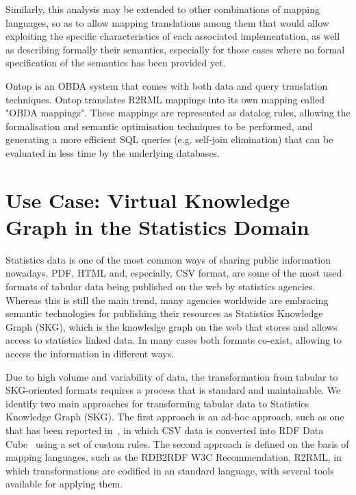 Similarly, this analysis may be extended to other combinations of mapping languages, so as to allow mapping translations among them that would allow exploiting the specific characteristics of each associated implementation, as well as describing formally their semantics, especially for those cases where no formal specification of the semantics has been provided yet.

Ontop \citep{rodriguez2015efficient} is an OBDA system that comes with both data and query translation techniques. Ontop translates R2RML mappings into its own mapping called "OBDA mappings". These mappings are represented as datalog rules, allowing the formalisation and semantic optimisation techniques to be performed, and generating a more efficient SQL queries (e.g. self-join elimination) that can be evaluated in less time by the underlying databases.


\section{Use Case: Virtual Knowledge Graph in the Statistics Domain}
\label{sec:chap4_rmlc}

Statistics data is one of the most common ways of sharing public information nowadays. PDF, HTML and, especially, CSV format, are some of the most used formats of tabular data being published on the web by statistics agencies. Whereas this is still the main trend, many agencies worldwide are embracing semantic technologies for publishing their resources as Statistics Knowledge Graph (SKG), which is the knowledge graph on the web that stores and allows access to statistics linked data. In many cases both formats co-exist, allowing to access the information in different ways. 

Due to high volume and variability of data, the transformation from tabular to SKG-oriented formats requires a process that is standard and maintainable. We identify two main approaches for transforming tabular data to Statistics Knowledge Graph (SKG). The first approach is an ad-hoc approach, such as one that has been reported in~\citep{corcho2017publishing}, in which CSV data is converted into RDF Data Cube~\citep{cyganiak2012rdf} using a set of custom rules. The second approach is defined on the basis of mapping languages, such as the RDB2RDF W3C Recommendation, R2RML, in which transformations are codified in an standard language, with several tools available for applying them.

